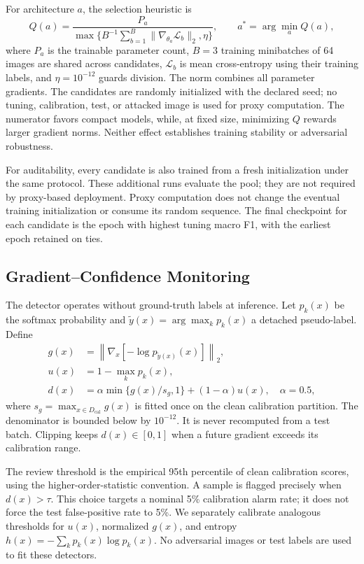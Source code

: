 \documentclass{svproc}
\begin{document}
For architecture $a$, the selection heuristic is
\begin{equation}
 Q(a)=\frac{P_a}{\max\{B^{-1}\sum_{b=1}^{B}\|\nabla_{\theta_a}\mathcal{L}_b\|_2,\eta\}},
 \qquad a^*=\arg\min_a Q(a),
 \label{eq:proxy}
\end{equation}
where $P_a$ is the trainable parameter count, $B=3$ training minibatches of 64 images are shared across candidates, $\mathcal{L}_b$ is mean cross-entropy using their training labels, and $\eta=10^{-12}$ guards division. The norm combines all parameter gradients. The candidates are randomly initialized with the declared seed; no tuning, calibration, test, or attacked image is used for proxy computation. The numerator favors compact models, while, at fixed size, minimizing $Q$ rewards larger gradient norms. Neither effect establishes training stability or adversarial robustness.

For auditability, every candidate is also trained from a fresh initialization under the same protocol. These additional runs evaluate the pool; they are not required by proxy-based deployment. Proxy computation does not change the eventual training initialization or consume its random sequence. The final checkpoint for each candidate is the epoch with highest tuning macro F1, with the earliest epoch retained on ties.

\subsection{Gradient--Confidence Monitoring}
The detector operates without ground-truth labels at inference. Let $p_k(x)$ be the softmax probability and $\tilde y(x)=\arg\max_k p_k(x)$ a detached pseudo-label. Define
\begin{align}
 g(x)&=\left\|\nabla_x\left[-\log p_{\tilde y(x)}(x)\right]\right\|_2,\\
 u(x)&=1-\max_k p_k(x),\\
 d(x)&=\alpha\min\{g(x)/s_g,1\}+(1-\alpha)u(x),\quad \alpha=0.5,
 \label{eq:detector}
\end{align}
where $s_g=\max_{x\in D_{\mathrm{cal}}}g(x)$ is fitted once on the clean calibration partition. The denominator is bounded below by $10^{-12}$. It is never recomputed from a test batch. Clipping keeps $d(x)\in[0,1]$ when a future gradient exceeds its calibration range.

The review threshold is the empirical 95th percentile of clean calibration scores, using the higher-order-statistic convention. A sample is flagged precisely when $d(x)>\tau$. This choice targets a nominal 5\% calibration alarm rate; it does not force the test false-positive rate to 5\%. We separately calibrate analogous thresholds for $u(x)$, normalized $g(x)$, and entropy $h(x)=-\sum_k p_k(x)\log p_k(x)$. No adversarial images or test labels are used to fit these detectors.
\end{document}
